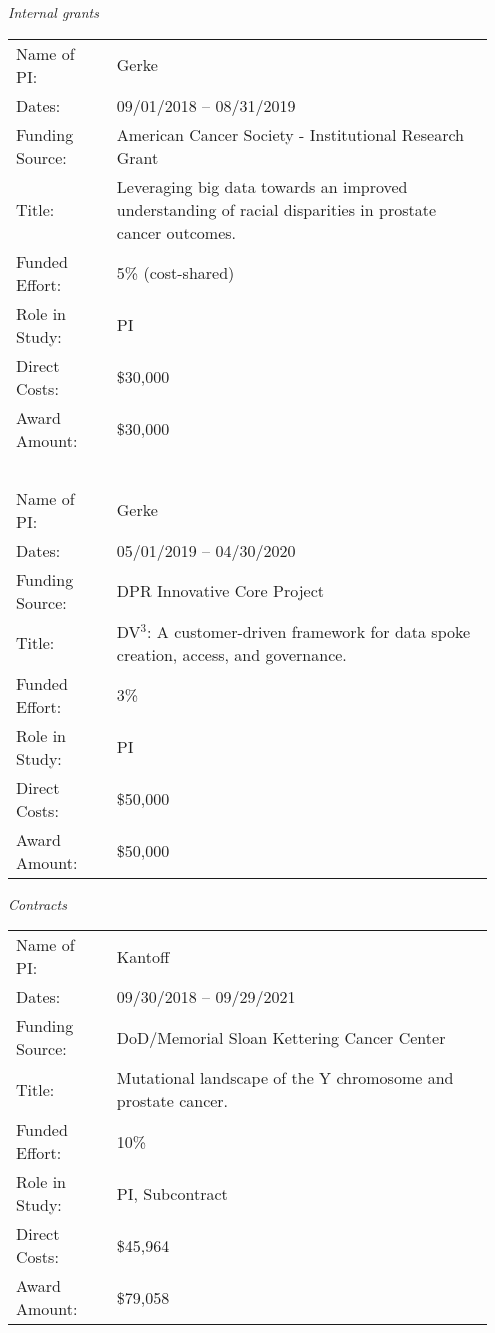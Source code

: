 \documentclass[11pt, a4paper]{article} %
\begin{document}
\emph{Internal grants}
\begin{longtable}{@{}p{0.2\linewidth} p{0.75\linewidth}}
Name of PI: & Gerke \\
Dates: & 09/01/2018 -- 08/31/2019\\
Funding Source: & American Cancer Society - Institutional Research Grant\\
Title: & Leveraging big data towards an improved understanding of racial disparities in prostate cancer outcomes.\\
Funded Effort: & 5\% (cost-shared)\\
Role in Study: & PI \\
Direct Costs: & \$30,000\\
Award Amount: & \$30,000\\
~\\
Name of PI: & Gerke \\
Dates: & 05/01/2019 -- 04/30/2020\\
Funding Source: & DPR Innovative Core Project\\
Title: & DV$^3$: A customer-driven framework for data spoke creation, access, and governance.\\
Funded Effort: & 3\% \\
Role in Study: & PI \\
Direct Costs: & \$50,000\\
Award Amount: & \$50,000\\
\end{longtable}

\emph{Contracts}
\begin{longtable}{@{}p{0.2\linewidth} p{0.75\linewidth}}
Name of PI: & Kantoff\\
Dates: & 09/30/2018 -- 09/29/2021\\
Funding Source: & DoD/Memorial Sloan Kettering Cancer Center\\
Title: & Mutational landscape of the Y chromosome and prostate cancer.\\
Funded Effort: & 10\%\\
Role in Study: & PI, Subcontract \\
Direct Costs: & \$45,964\\
Award Amount: & \$79,058\\
\end{longtable}
\end{document}
